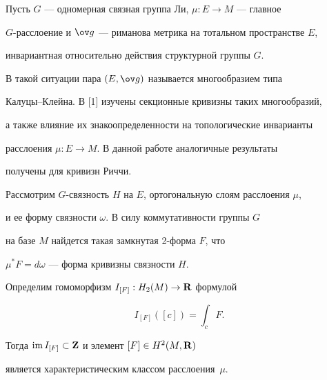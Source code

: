 \date{}




\pagestyle{plain} %







\maketitle


\label{begin}





Пусть $G$ --- одномерная связная группа Ли, $\mu:E\to M$ --- главное


$G$-расслоение и $\g$ --- риманова метрика на тотальном пространстве $E$,


инвариантная относительно действия структурной группы $G$.


В такой ситуации пара $(E,\g)$ называется многообразием типа


Калуцы--Клейна. В [1] изучены секционные кривизны таких многообразий,


а также влияние их знакоопределенности на топологические инварианты


расслоения $\mu:E\to M$. В данной работе аналогичные результаты


получены для кривизн Риччи.





Рассмотрим $G$-связность $H$ на $E$, ортогональную слоям расслоения $\mu$,


и ее форму связности $\omega$. В силу коммутативности группы $G$


на базе $M$ найдется такая замкнутая 2-форма $F$, что


$\mu^{*}F=d\omega$ --- форма кривизны связности $H$.


Определим гомоморфизм $I_{[F]}:H_2(M)\to{\bold R}$ формулой


$$


I_{[F]}([c])=\int_c F.


$$


Тогда $\operatorname{im} I_{[F]}\subset{\bold Z}$ и элемент $[F]\in H^2(M,{\bold R})$


является характеристическим классом расслоения~$\mu$.





